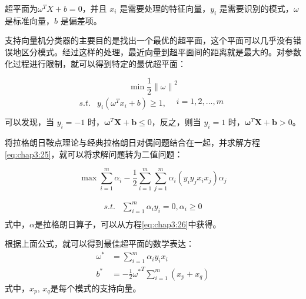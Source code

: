 超平面为${\omega ^T}X + b = 0$，并且 $x_i$ 是需要处理的特征向量，$y_i$ 是需要识别的模式，$\omega$ 是标准向量，$b$ 是偏差项。

支持向量机分类器的主要目的是找出一个最优的超平面，这个平面可以几乎没有错误地区分模式。经过这样的处理，最近向量到超平面间的距离就是最大的。对参数化过程进行限制，就可以得到特定的最优超平面：

\begin{equation}
\min \frac{1}{2}{\left\| {\left. \omega  \right\|} \right.^2}
\label{eq:chap3:25}
\end{equation}
\begin{equation*}
\begin{array}{*{20}{c}}
   {s.t.} & {{y_i}\left( {{\omega ^T}{x_i} + b} \right) \ge 1,\begin{array}{*{20}{c}}
   {} & {i = 1,2,...,m}  \\
\end{array}}  \\
\end{array}
\end{equation*}
可以发现，当 $y_i=-1$ 时，$\bm{\omega}^T\bm{X}+\bm{b} \leq 0$，反之，则当 $y_i=1$ 时，$\bm{\omega}^T\bm{X}+\bm{b} > 0$。

将拉格朗日鞍点理论与经典拉格朗日对偶问题结合在一起，并求解方程\ref{eq:chap3:25}，就可以将求解问题转为二值问题：

\begin{equation}
\max \sum\limits_{i = 1}^m {{\alpha _i} - \frac{1}{2}\sum\limits_{i = 1}^m {\sum\limits_{j = 1}^m {{\alpha _i}\left( {{y_i}{y_j}{x_i}{x_j}} \right)} {\alpha _j}} }
\label{eq:chap3:26}
\end{equation}

\begin{equation*}
\begin{array}{*{20}{c}}
   {s.t.} & {\sum\limits_{i = 1}^m {{\alpha _i}{y_i} = 0,{\alpha _i} \ge 0} }  \\
\end{array}
\end{equation*}
式中，$\alpha$是拉格朗日算子，可以从方程\ref{eq:chap3:26}中获得。

根据上面公式，就可以得到最佳超平面的数学表达：
\begin{align}
  {\omega ^*} &= \sum\limits_{i = 1}^m {{\alpha _i}{y_i}{x_i}}
  \label{eq:chap3:27}\\
  {b^*} &=  - \frac{1}{2}{\omega ^*}^T\sum\limits_{i = 1}^m {\left( {{x_p} + {x_q}} \right)}
  \label{eq:chap3:28}
\end{align}
式中，$x_p$, $x_q$是每个模式的支持向量。

